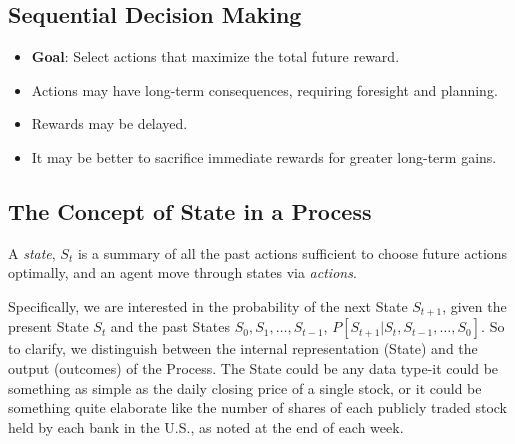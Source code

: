 \subsection{Sequential Decision Making}
\begin{itemize}
    \item \textbf{Goal}: Select actions that maximize the total future reward.
    \item Actions may have long-term consequences, requiring foresight and planning.
    \item Rewards may be delayed.
    \item It may be better to sacrifice immediate rewards for greater long-term gains.
\end{itemize}

\subsection{The Concept of State in a Process}

A \textit{state}, $S_t$ is a summary of all the past actions sufficient to choose future actions optimally, and an agent move through states via \textit{actions}.


Specifically, we are interested in the probability of the next State $S_{t+1}$, given the present State $S_t$ and the past States $S_0, S_1, \dots, S_{t-1}$, \ie $P[S_{t+1}|S_t, S_{t-1},\dots, S_0]$. So to clarify, we distinguish between the internal representation (State) and the output (outcomes) of the Process. The State could be any data type-it could be something as simple as the daily closing price of a single stock, or it could be something quite elaborate like the number of shares of each publicly traded stock held by each bank in the U.S., as noted at the end of each week.


